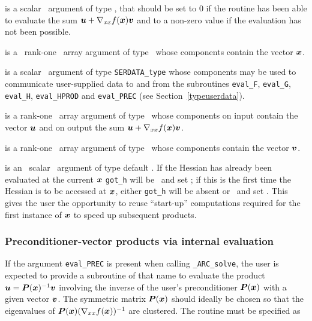 \documentclass{galahad}
\newcommand{\packagename}{ARC}
\newcommand{\fullpackagename}{\libraryname\_\packagename}
\newcommand{\solver}{{\tt \fullpackagename\_solve}}
\begin{document}
\begin{description}
 is a scalar \intentout\ argument of type \integer,
that should be set to 0 if the routine has been able to evaluate the
sum ${\bm{u}} + \nabla_{xx} f({\bm{x}}) {\bm{v}}$
and to a non-zero value if the evaluation has not been possible.

 is a \ rank-one \intentin\ array argument of type
\realdp\ whose components contain the vector ${\bm{x}}$.

 is a scalar \intentinout\ argument of type
{\tt SERDATA\_type} whose components may be used
to communicate user-supplied data to and from the
subroutines {\tt eval\_F}, {\tt eval\_G},
{\tt eval\_H}, {\tt eval\_HPROD} and {\tt eval\_PREC}
(see Section~\ref{typeuserdata}).

 is a rank-one \intentinout\ array argument of type \realdp\
whose components on input contain the vector ${\bm{u}}$ and on output the
sum ${\bm{u}} + \nabla_{xx} f({\bm{x}}) {\bm{v}}$.

 is a rank-one \intentin\ array argument of type \realdp\
whose components contain the vector ${\bm{v}}$.

 is an \optional\ scalar \intentin\ argument of type default
\logical. If the Hessian has already been evaluated at the current ${\bm{x}}$
{\tt got\_h} will be \present\ and set \true; if this is the first time
the Hessian is to be accessed at ${\bm{x}}$, either {\tt got\_h} will be absent
or \present\ and set \false. This gives the user the opportunity
to reuse ``start-up'' computations required for the first instance of
${\bm{x}}$ to speed up subsequent products.

\end{description}


\subsubsection{Preconditioner-vector products via internal evaluation\label{pv}}

If the argument {\tt eval\_PREC} is present when calling \solver, the
user is expected to provide a subroutine of that name to evaluate the
product ${\bm{u}} = {\bm{P}}({\bm{x}})^{-1} {\bm{v}}$ involving the inverse of the user's 
preconditioner ${\bm{P}}({\bm{x}})$ with a given vector ${\bm{v}}$. 
The symmetric matrix ${\bm{P}}({\bm{x}})$ should ideally be chosen so that the 
eigenvalues of ${\bm{P}}({\bm{x}}) (\nabla_{xx} f({\bm{x}}))^{-1}$ are clustered.
The routine must be specified as
\end{document}

